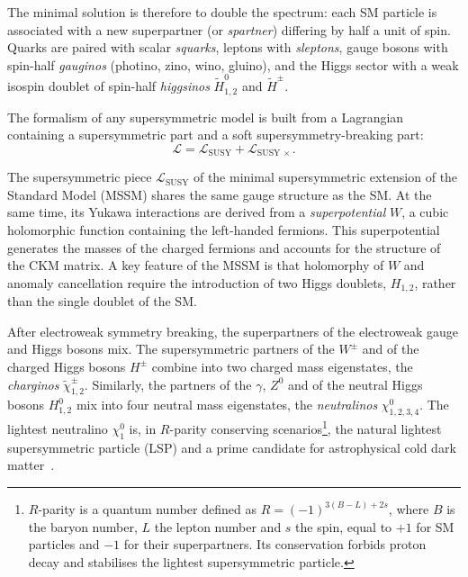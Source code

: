 The minimal solution is therefore to double the spectrum: each SM particle is associated with a new superpartner (or \textit{spartner}) differing by half a unit of spin. Quarks are paired with scalar \textit{squarks}, leptons with \textit{sleptons}, gauge bosons with spin-half \textit{gauginos} (photino, zino, wino, gluino), and the Higgs sector with a weak isospin doublet of spin-half \textit{higgsinos} $\tilde{H}_{1,2}^0$ and $\tilde{H}^\pm$.

\vspace{0.5 cm}

The formalism of any supersymmetric model is built from a Lagrangian containing a supersymmetric part and a soft supersymmetry-breaking part:
\begin{equation}
    \mathcal{L} = \mathcal{L}_\mathrm{SUSY} 
                + \mathcal{L}_{\mathrm{SUSY}\, \times} .
\end{equation}

The supersymmetric piece $\mathcal{L}_\mathrm{SUSY}$ of the minimal supersymmetric extension of the Standard Model (MSSM) shares the same gauge structure as the SM. At the same time, its Yukawa interactions are derived from a \textit{superpotential} $W$, a cubic holomorphic function containing the left-handed fermions. This superpotential generates the masses of the charged fermions and accounts for the structure of the CKM matrix. A key feature of the MSSM is that holomorphy of $W$ and anomaly cancellation require the introduction of two Higgs doublets, $H_{1,2}$, rather than the single doublet of the SM.

After electroweak symmetry breaking, the superpartners of the electroweak gauge and Higgs bosons mix. The supersymmetric partners of the $W^\pm$ and of the charged Higgs bosons $H^\pm$ combine into two charged mass eigenstates, the \textit{charginos} $\tilde{\chi}_{1,2}^\pm$. Similarly, the partners of the $\gamma$, $Z^0$ and of the neutral Higgs bosons $H_{1,2}^0$ mix into four neutral mass eigenstates, the \textit{neutralinos} $\chi_{1,2,3,4}^0$. The lightest neutralino $\chi_1^0$ is, in $R$-parity conserving scenarios\footnote{$R$-parity is a quantum number defined as $R=(-1)^{3(B-L)+2s}$, where $B$ is the baryon number, $L$ the lepton number and $s$ the spin, equal to $+1$ for SM particles and $-1$ for their superpartners. Its conservation forbids proton decay and stabilises the lightest supersymmetric particle.}, the natural lightest supersymmetric particle (LSP) and a prime candidate for astrophysical cold dark matter~\cite{ELLIS1984453}.

